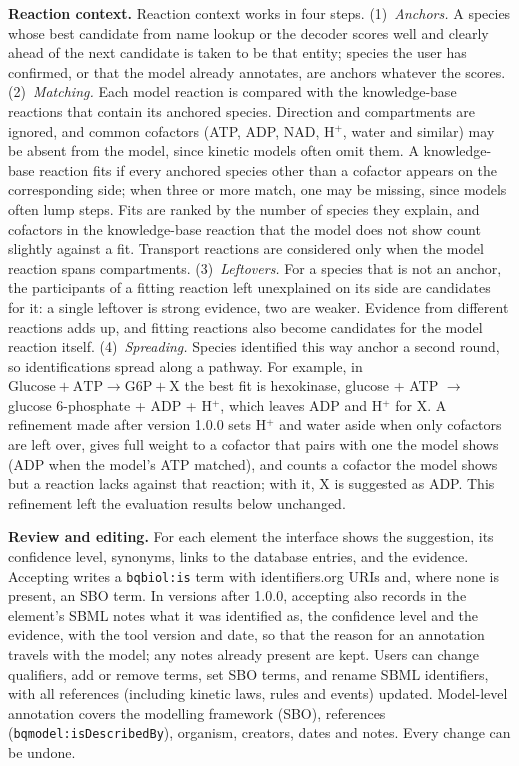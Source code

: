 \documentclass[10pt]{article}
\begin{document}
\textbf{Reaction context.} Reaction context works in four steps. (1)~\emph{Anchors.} A species whose best
candidate from name lookup or the decoder scores well and clearly ahead of the next candidate is taken to be
that entity; species the user has confirmed, or that the model already annotates, are anchors whatever the
scores. (2)~\emph{Matching.} Each model reaction is compared with the knowledge-base reactions that contain
its anchored species. Direction and compartments are ignored, and common cofactors (ATP, ADP, NAD, H$^+$,
water and similar) may be absent from the model, since kinetic models often omit them. A knowledge-base
reaction fits if every anchored species other than a cofactor appears on the corresponding side; when three
or more match, one may be missing, since models often lump steps. Fits are ranked by the number of species
they explain, and cofactors in the knowledge-base reaction that the model does not show count slightly
against a fit. Transport reactions are considered only when the model reaction spans compartments.
(3)~\emph{Leftovers.} For a species that is not an anchor, the participants of a fitting reaction left
unexplained on its side are candidates for it: a single leftover is strong evidence, two are weaker. Evidence
from different reactions adds up, and fitting reactions also become candidates for the model reaction itself.
(4)~\emph{Spreading.} Species identified this way anchor a second round, so identifications spread along a
pathway. For example, in $\mathrm{Glucose} + \mathrm{ATP} \rightarrow \mathrm{G6P} + \mathrm{X}$ the best fit
is hexokinase, glucose + ATP $\rightarrow$ glucose 6-phosphate + ADP + H$^+$,
which leaves ADP and H$^+$ for X. A refinement made after version 1.0.0 sets H$^+$ and water aside when only
cofactors are left over, gives full weight to a cofactor that pairs with one the model shows (ADP when the
model's ATP matched), and counts a cofactor the model shows but a reaction lacks against that reaction; with
it, X is suggested as ADP. This refinement left the evaluation results below unchanged.

\textbf{Review and editing.} For each element the interface shows the suggestion, its confidence level,
synonyms, links to the database entries, and the evidence. Accepting writes a \texttt{bqbiol:is} term with
identifiers.org URIs and, where none is present, an SBO term. In versions after 1.0.0, accepting also records
in the element's SBML notes what it was identified as, the confidence level and the evidence, with the tool
version and date, so that the reason for an annotation travels with the model; any notes already present are
kept. Users can change qualifiers, add or remove
terms, set SBO terms, and rename SBML identifiers, with all references (including kinetic laws, rules and
events) updated. Model-level annotation covers the modelling framework (SBO), references
(\texttt{bqmodel:isDescribedBy}), organism, creators, dates and notes. Every change can be undone.
\end{document}
